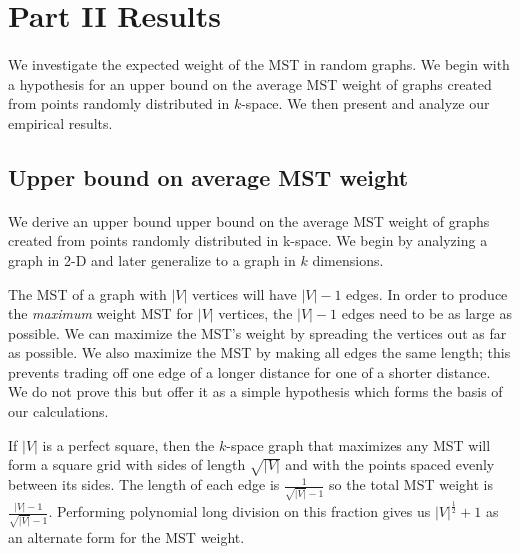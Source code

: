 \section{Part II Results}
\label{sec:part2}

\paragraph{}
We investigate the expected weight of the MST in random graphs. We begin with a
hypothesis for an upper bound on the average MST weight of graphs created from
points randomly distributed in $k$-space. We then present and analyze our
empirical results.


\subsection{Upper bound on average MST weight}
\paragraph{}
We derive an upper bound upper bound on the average MST weight of graphs created
from points randomly distributed in k-space. We begin by analyzing a graph in
2-D and later generalize to a graph in $k$ dimensions.

The MST of a graph with $|V|$ vertices will have $|V|-1$ edges. In order to
produce the \textit{maximum} weight MST for $|V|$ vertices, the $|V|-1$ edges
need to be as large as possible. We can maximize the MST's weight by spreading
the vertices out as far as possible. We also maximize the MST by making all
edges the same length; this prevents trading off one edge of a longer distance
for one of a shorter distance. We do not prove this but offer it as a simple
hypothesis which forms the basis of our calculations.

If $|V|$ is a perfect square, then the $k$-space graph that maximizes any MST will form a
square grid with sides of length $\sqrt{|V|}$ and with the points spaced evenly
between its sides. The length of each edge is $\frac{1}{\sqrt{|V|}-1}$ so the
total MST weight is $\frac{|V|-1}{\sqrt{|V|}-1}$. Performing polynomial long
division on this fraction gives us $|V|^{\frac{1}{2}}+1$ as an alternate form
for the MST weight.

